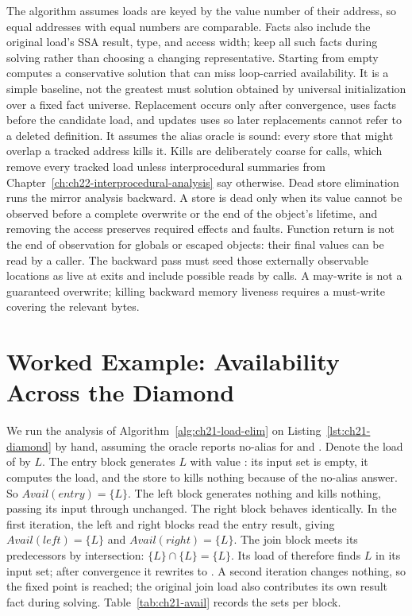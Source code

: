 The algorithm assumes loads are keyed by the value number of their address, so equal addresses with equal numbers are comparable.
Facts also include the original load's SSA result, type, and access width; keep all such facts during solving rather than choosing a changing representative.
Starting from empty computes a conservative solution that can miss loop-carried availability.
It is a simple baseline, not the greatest must solution obtained by universal initialization over a fixed fact universe.
Replacement occurs only after convergence, uses facts before the candidate load, and updates uses so later replacements cannot refer to a deleted definition.
It assumes the alias oracle is sound: every store that might overlap a tracked address kills it.
Kills are deliberately coarse for calls, which remove every tracked load unless interprocedural summaries from Chapter~\ref{ch:ch22-interprocedural-analysis} say otherwise.
Dead store elimination runs the mirror analysis backward.
A store is dead only when its value cannot be observed before a complete overwrite or the end of the object's lifetime, and removing the access preserves required effects and faults.
Function return is not the end of observation for globals or escaped objects: their final values can be read by a caller.
The backward pass must seed those externally observable locations as live at exits and include possible reads by calls.
A may-write is not a guaranteed overwrite; killing backward memory liveness requires a must-write covering the relevant bytes.

\section{Worked Example: Availability Across the Diamond}
\label{sec:ch21-worked-availability}

We run the analysis of Algorithm~\ref{alg:ch21-load-elim} on Listing~\ref{lst:ch21-diamond} by hand, assuming the oracle reports no-alias for  and .
Denote the load of  by $L$.
The entry block generates $L$ with value : its input set is empty, it computes the load, and the store to  kills nothing because of the no-alias answer.
So $Avail(entry) = \{L\}$.
The left block generates nothing and kills nothing, passing its input through unchanged.
The right block behaves identically.
In the first iteration, the left and right blocks read the entry result, giving $Avail(left) = \{L\}$ and $Avail(right) = \{L\}$.
The join block meets its predecessors by intersection: $\{L\} \cap \{L\} = \{L\}$.
Its load of  therefore finds $L$ in its input set; after convergence it rewrites to .
A second iteration changes nothing, so the fixed point is reached; the original join load also contributes its own result fact during solving.
Table~\ref{tab:ch21-avail} records the sets per block.

